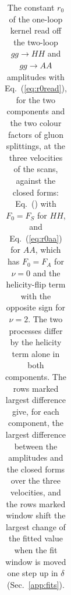 \begin{table}[!htb]
\begin{tabular}{llcccc}
\bottomrule
\end{tabular}
\caption{The constant $r_0$ of the one-loop kernel read off the two-loop $gg\to HH$ and $gg\to AA$ amplitudes with Eq.~(\ref{eq:r0read}), for the two components and the two colour factors of gluon splittings, at the three velocities of the scans, against the closed forms: Eq.~() with $F_0=F_S$ for $HH$, and Eq.~(\ref{eq:r0aa}) for $AA$, which has $F_0=F_A$ for $\nu=0$ and the helicity-flip term with the opposite sign for $\nu=2$. The two processes differ by the helicity term alone in both components. The rows marked largest difference give, for each component, the largest difference between the amplitudes and the closed forms over the three velocities, and the rows marked window shift the largest change of the fitted value when the fit window is moved one step up in $\delta$ (Sec.~\ref{app:fits}).}
\label{tab:r0amp}
\end{table}
